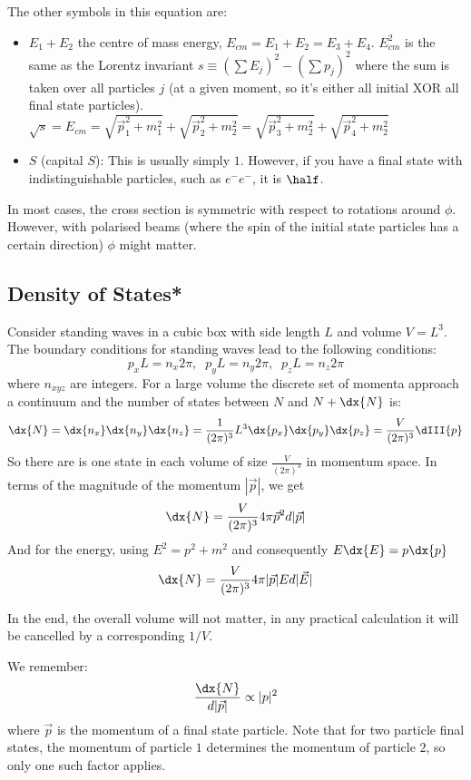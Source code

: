 The other symbols in this equation are:
\begin{itemize}
\item $E_1 + E_2$ the centre of mass energy, $E_{cm} = E_1 + E_2 = E_3 + E_4$. $E_{cm}^2$ is the same as the Lorentz invariant $s \equiv (\sum E_j)^2 - (\sum p_j)^2$ where the sum is taken over all particles $j$ (at a given moment, so it's either all initial XOR all final state particles). $ \sqrt{s} = E_{cm}= \sqrt{\vec{p}_1^2 + m_1^2} + \sqrt{\vec{p}_2^2 + m_2^2} = \sqrt{\vec{p}_3^2 + m_2^2} + \sqrt{\vec{p}_4^2 + m_2^2}$
\item $S$ (capital $S$): This is usually simply $1$. However, if you have a final state with indistinguishable particles, such as $e^- e^-$, it is $\half$.
\end{itemize}
In most cases, the cross section is symmetric with respect to rotations around $\phi$. However, with polarised beams (where the spin of the initial state particles has a certain direction) $\phi$ might matter.

\subsection{Density of States*}
\label{sec:densityOfStates}
 Consider standing waves in a cubic box with side length $L$ and volume $V=L^3$. The boundary conditions for standing waves lead to the following conditions:
\begin{equation}
 p_x L = n_x 2\pi,\;\;
 p_y L = n_y 2\pi,\;\;
 p_z L = n_z 2\pi
\end{equation}
 where $n_{xyz}$ are integers. For a large volume the discrete set of
 momenta approach a continuum and the number of states between $N$
 and $N+\dx{N}$ is:
\begin{equation}
 \dx{N} = \dx{n_x}\dx{n_y}\dx{n_z}
        = \frac{1}{(2\pi)^3} L^3 \dx{p_x}\dx{p_y}\dx{p_z}
        = \frac{V}{(2\pi)^3} \dIII{p}
\end{equation}
So there are is one state in each volume of size $\frac{V}{(2\pi)^3}$ in momentum space. In terms of the magnitude of the momentum $|\vec{p}|$, we get
\begin{equation}
\dx{N} = \frac{V}{(2\pi)^3} 4\pi \vec{p}^2 d|\vec{p}|
\end{equation}
And for the energy, using $E^2 = p^2 + m^2$ and consequently $E\dx{E} = p\dx{p}$
\begin{equation}
\dx{N} = \frac{V}{(2\pi)^3} 4\pi |\vec{p}| E d|\vec{E}|
\end{equation}

In the end, the overall volume will not matter, in any practical calculation it will be cancelled by a corresponding $1/V$. 

We remember:
\begin{equation}
\frac{\dx{N}}{d|\vec{p}|} \propto |p|^2
\end{equation}
where $\vec{p}$ is the momentum of a final state particle.
Note that for two particle final states, the momentum of particle $1$ determines the momentum of particle $2$, so only one such factor applies.

